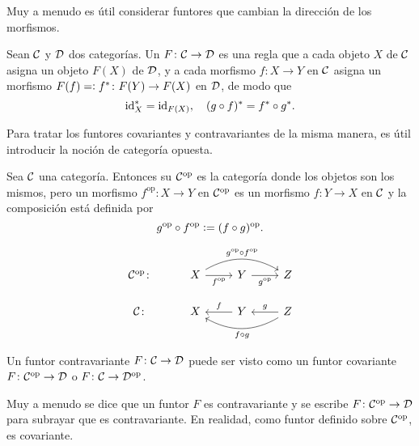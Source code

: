 \documentclass{article}
\numberwithin{equation}{section}
\theoremstyle{definition}
\begin{document}
Muy a menudo es útil considerar funtores que cambian la dirección de los
morfismos.

\begin{definicion}
  Sean $\mathcal{C}$ y $\mathcal{D}$ dos categorías. Un  $F\colon \mathcal{C} \to \mathcal{D}$ es una regla que a cada
  objeto $X$ de $\mathcal{C}$ asigna un objeto $F (X)$ de $\mathcal{D}$, y a cada
  morfismo $f\colon X\to Y$ en $\mathcal{C}$ asigna un morfismo
  $F (f) =\mathrel{\mathop:} f^* \colon F (Y) \to F (X)$ en $\mathcal{D}$, de modo que
  $$\mathrm{id}_{X}^* = \mathrm{id}_{F (X)}, \quad (g\circ f)^* = f^*\circ g^*.$$
\end{definicion}

Para tratar los funtores covariantes y contravariantes de la misma manera, es
útil introducir la noción de categoría opuesta.

\begin{definicion}
  Sea $\mathcal{C}$ una categoría. Entonces su 
  $\mathcal{C}^\mathrm{op}$ es la categoría donde los objetos son los mismos,
  pero un morfismo $f^\mathrm{op}\colon X\to Y$ en $\mathcal{C}^\mathrm{op}$ es
  un morfismo $f\colon Y\to X$ en $\mathcal{C}$ y la composición está definida
  por
  $$g^\mathrm{op} \circ f^\mathrm{op} \mathrel{\mathop:}= (f\circ g)^\mathrm{op}.$$

  \[ \begin{tikzcd}
      \vcateg{C}^\mathrm{op}\colon & X\ar{r}[swap]{f^\mathrm{op}}\ar[bend left]{rr}{g^\mathrm{op}\circ f^\mathrm{op}} & Y\ar{r}[swap]{g^\mathrm{op}} & Z \\
      \vcateg{C}\colon & X & Y\ar{l}[swap]{f} & Z\ar{l}[swap]{g}\ar[bend left]{ll}{f\circ g}
    \end{tikzcd} \]
\end{definicion}

\begin{observacion}
  Un funtor contravariante $F\colon \mathcal{C} \to \mathcal{D}$ puede ser visto
  como un funtor covariante $F\colon \mathcal{C}^\mathrm{op} \to \mathcal{D}$ o
  $F\colon \mathcal{C} \to \mathcal{D}^\mathrm{op}$.
\end{observacion}

\begin{comentario}
  Muy a menudo se dice que un funtor $F$ es contravariante y se escribe
  $F\colon \mathcal{C}^\mathrm{op} \to \mathcal{D}$ para subrayar que es
  contravariante. En realidad, como funtor definido sobre
  $\mathcal{C}^\mathrm{op}$, es covariante.
\end{comentario}
\end{document}
